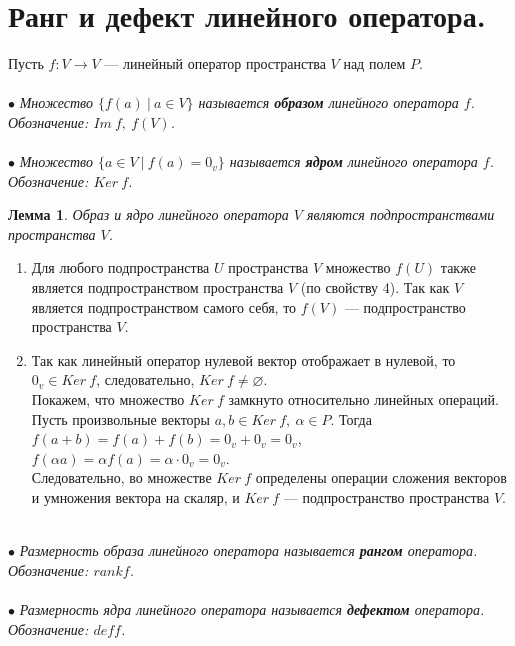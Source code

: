 \section{Ранг и дефект линейного оператора.}
Пусть $f:V\rightarrow V$ --- линейный оператор пространства $V$ над полем $P$.\\\\
$\bullet$ \textit{Множество $\{f(a)\ |\ a\in V\}$ называется \textbf{образом} линейного оператора $f$. Обозначение: $Im\ f,\ f(V)$.}\\\\
$\bullet$ \textit{Множество $\{a\in V\ |\ f(a) = 0_v\}$ называется \textbf{ядром} линейного оператора $f$. Обозначение: $Ker\ f$.}
\newtheorem*{lem11_4_1}{Лемма}\begin{lem11_4_1}Образ и ядро линейного оператора $V$ являются подпространствами пространства $V$.
\end{lem11_4_1}
\begin{Proof}\begin{enumerate}
		\item Для любого подпространства $U$ пространства $V$ множество $f(U)$ также является подпространством пространства $V$ (по свойству 4). Так как $V$ является подпространством самого себя, то $f(V)$ --- подпространство пространства $V$.
		\item Так как линейный оператор нулевой вектор отображает в нулевой, то $0_v \in Ker\ f$, следовательно, $Ker\ f \ne \varnothing$.\\
		Покажем, что множество $Ker\ f$ замкнуто относительно линейных операций. Пусть произвольные векторы $a, b \in Ker\ f,\ \alpha \in P.$ Тогда\\
		$f(a+b) = f(a) + f(b) = 0_v + 0_v = 0_v$,\\
		$f(\alpha a) = \alpha  f(a) = \alpha \cdot 0_v = 0_v$.\\ Следовательно, во множестве $Ker\ f$ определены операции сложения векторов и умножения вектора на скаляр, и $Ker\ f$ --- подпространство пространства $V$.
	\end{enumerate}
\end{Proof}\\
$\bullet$ \textit{Размерность образа линейного оператора называется \textbf{рангом} оператора. Обозначение: $rank f$.}\\\\
$\bullet$ \textit{Размерность ядра линейного оператора называется \textbf{дефектом} оператора. Обозначение: $def f$.}

